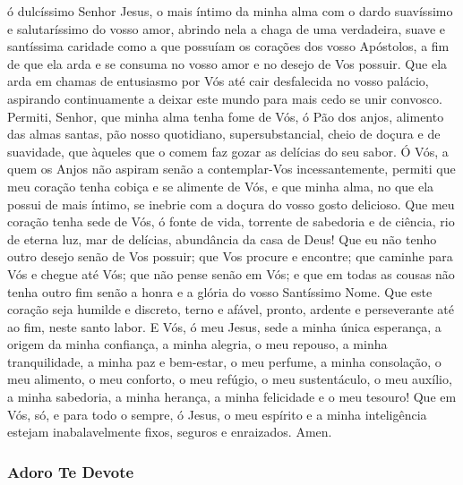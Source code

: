 \begin{paracol}{2}
{ ó dulcíssimo Senhor Jesus, o mais íntimo da minha alma com o dardo suavíssimo e salutaríssimo do vosso amor, abrindo nela a chaga de uma verdadeira, suave e santíssima caridade como a que possuíam os corações dos vosso Apóstolos, a fim de que ela arda e se consuma no vosso amor e no desejo de Vos possuir. Que ela arda em chamas de entusiasmo por Vós até cair desfalecida no vosso palácio, aspirando continuamente a deixar este mundo para mais cedo se unir convosco. Permiti, Senhor, que minha alma tenha fome de Vós, ó Pão dos anjos, alimento das almas santas, pão nosso quotidiano, supersubstancial, cheio de doçura e de suavidade, que àqueles que o comem faz gozar as delícias do seu sabor. Ó Vós, a quem os Anjos não aspiram senão a contemplar-Vos incessantemente, permiti que meu coração tenha cobiça e se alimente de Vós, e que minha alma, no que ela possui de mais íntimo, se inebrie com a doçura do vosso gosto delicioso. Que meu coração tenha sede de Vós, ó fonte de vida, torrente de sabedoria e de ciência, rio de eterna luz, mar de delícias, abundância da casa de Deus! Que eu não tenho outro desejo senão de Vos possuir; que Vos procure e encontre; que caminhe para Vós e chegue até Vós; que não pense senão em Vós; e que em todas as cousas não tenha outro fim senão a honra e a glória do vosso Santíssimo Nome. Que este coração seja humilde e discreto, terno e afável, pronto, ardente e perseverante até ao fim, neste santo labor. E Vós, ó meu Jesus, sede a minha única esperança, a origem da minha confiança, a minha alegria, o meu repouso, a minha tranquilidade, a minha paz e bem-estar, o meu perfume, a minha consolação, o meu alimento, o meu conforto, o meu refúgio, o meu sustentáculo, o meu auxílio, a minha sabedoria, a minha herança, a minha felicidade e o meu tesouro! Que em Vós, só, e para todo o sempre, ó Jesus, o meu espírito e a minha inteligência estejam inabalavelmente fixos, seguros e enraizados. Amen.
}\end{paracol}

\subsubsection{Adoro Te Devote}



